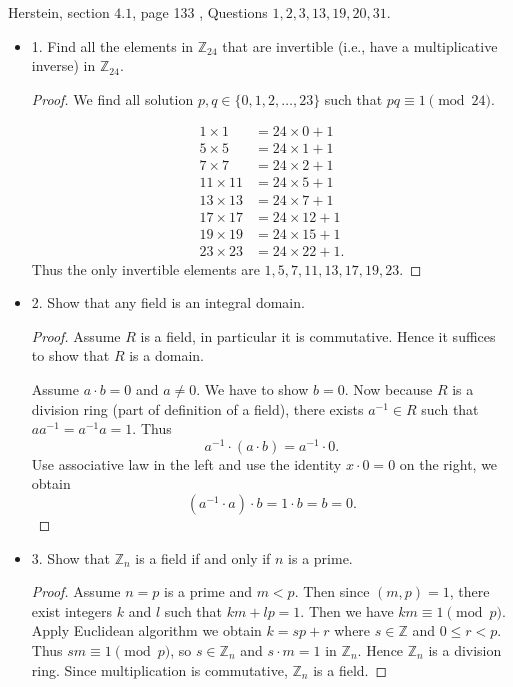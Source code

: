 Herstein, section $4.1$, page 133 , Questions $1,2,3,13,19,20,31$. 
\begin{itemize}
	\item 1. Find all the elements in $\mathbb{Z}_{24}$ that are invertible (i.e., have a multiplicative inverse) in $\mathbb{Z}_{24}$.
\begin{proof}
	We find all solution $p,q \in \{0,1,2,\ldots,23\} $ such that $pq \equiv 1 \pmod {24}$.

	\begin{align*}
		1\times 1&=24\times 0+1 \\
5\times 5&=24\times 1+1\\
7\times 7&=24\times 2+1\\
11\times 11&=24\times 5+1\\
13\times 13&=24\times 7+1\\
17\times 17&=24\times 12+1\\
19\times 19&=24\times 15+1\\
23\times 23&=24\times 22+1
	.\end{align*}
Thus the only invertible elements are $1,5,7,11,13,17,19,23$.
\end{proof}

	\item 2. Show that any field is an integral domain.
\begin{proof}
	Assume $R$ is a field, in particular it is commutative. Hence it suffices to show that $R$ is a domain. 

	Assume $a \cdot b = 0$ and $a\neq 0$. We have to show $b = 0$. Now because $R$ is a division ring (part of definition of a field), there exists $a^{-1} \in R$ such that $a a^{-1} = a^{-1} a = 1$. Thus
	\[
		a^{-1} \cdot (a \cdot b) = a^{-1} \cdot 0
	.\] 
	Use associative law in the left and use the identity $x \cdot 0 = 0$ on the right, we obtain
	\[
		(a^{-1} \cdot a) \cdot b = 1 \cdot b = b = 0
	.\] 
\end{proof}

	\item 3. Show that $\mathbb{Z}_n$ is a field if and only if $n$ is a prime.
\begin{proof}
	Assume $n = p$ is a prime and $m < p$. Then since $(m,p) = 1$, there exist integers $k$ and $l$ such that $km + lp = 1$. Then we have  $km \equiv 1 \pmod p$. Apply Euclidean algorithm we obtain $k = s p + r$ where $s \in \mathbb{Z}$ and $0\le r<p$. Thus $s m \equiv 1 \pmod p$, so $s \in \mathbb{Z}_n$ and $s \cdot m = 1$ in $\mathbb{Z}_n$. Hence $\mathbb{Z}_n$ is a division ring. Since multiplication is commutative, $\mathbb{Z}_n$ is a field.


\end{proof}
\end{itemize}
